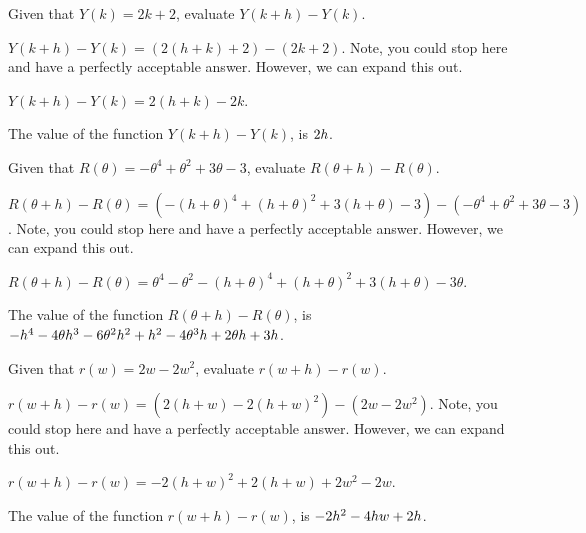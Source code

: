 \begin{shuffle}
\begin{exercise}
Given that $Y(k)=2 k+2$, evaluate $Y(k+h)-Y(k)$.
\begin{solution}
\begin{hint}
$Y(k+h)-Y(k)=(2 (h+k)+2)-(2 k+2)$. Note, you could stop here and have a perfectly acceptable answer. However, we can expand this out.
\end{hint}
\begin{hint}
$Y(k+h)-Y(k)=2 (h+k)-2 k$.
\end{hint}
The value of the function $Y(k+h)-Y(k)$, is ${2 h}$.
\end{solution}
\end{exercise}

\begin{exercise}
Given that $R(\theta)=-\theta ^4+\theta ^2+3 \theta -3$, evaluate $R(\theta+h)-R(\theta)$.
\begin{solution}
\begin{hint}
$R(\theta+h)-R(\theta)=(-(h+\theta )^4+(h+\theta )^2+3 (h+\theta )-3)-(-\theta ^4+\theta ^2+3 \theta -3)$. Note, you could stop here and have a perfectly acceptable answer. However, we can expand this out.
\end{hint}
\begin{hint}
$R(\theta+h)-R(\theta)=\theta ^4-\theta ^2-(h+\theta )^4+(h+\theta )^2+3 (h+\theta )-3 \theta$.
\end{hint}
The value of the function $R(\theta+h)-R(\theta)$, is ${-h^4-4 \theta  h^3-6 \theta ^2 h^2+h^2-4 \theta ^3 h+2 \theta  h+3 h}$.
\end{solution}
\end{exercise}

\begin{exercise}
Given that $r(w)=2 w-2 w^2$, evaluate $r(w+h)-r(w)$.
\begin{solution}
\begin{hint}
$r(w+h)-r(w)=(2 (h+w)-2 (h+w)^2)-(2 w-2 w^2)$. Note, you could stop here and have a perfectly acceptable answer. However, we can expand this out.
\end{hint}
\begin{hint}
$r(w+h)-r(w)=-2 (h+w)^2+2 (h+w)+2 w^2-2 w$.
\end{hint}
The value of the function $r(w+h)-r(w)$, is ${-2 h^2-4 h w+2 h}$.
\end{solution}
\end{exercise}


\end{shuffle}
